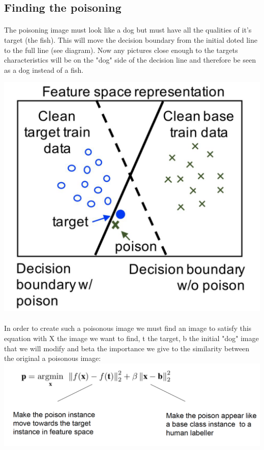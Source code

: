 \documentclass{article}
\begin{document}
\subsection{Finding the poisoning}
\paragraph{}
The poisoning image must look like a dog but must have all the qualities of it's target (the fish). This will move the decision boundary from the initial doted line to the full line (see diagram). Now any pictures close enough to the targets characteristics will be on the "dog" side of the decision line and therefore be seen as a dog instead of a fish.

\includegraphics[scale=0.3]{DataLinePoison.png}
\paragraph{}
In order to create such a poisonous image we must find an image to satisfy this equation with X the image we want to find, t the target, b the initial "dog" image that we will modify and beta the importance we give to the similarity between the original a poisonous image: \\
\includegraphics[scale=0.3]{Formula.png}
\end{document}
